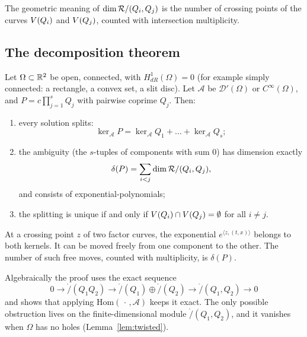 The geometric meaning of $\operatorname{dim}\mathcal{R}/(Q_i,Q_j)$ is the number of crossing points of the curves $V(Q_i)$ and $V(Q_j)$, counted with intersection multiplicity.

\subsection{The decomposition theorem}

\begin{theorem}\label{f:thm:factor}
Let $\Omega\subset\mathbb{R}^2$ be open, connected, with $H^1_{dR}(\Omega)=0$ (for example simply connected: a rectangle, a convex set, a slit disc). Let $\mathcal A$ be $\mathcal D'(\Omega)$ or $C^\infty(\Omega)$, and $P=c\prod_{j=1}^sQ_j$ with pairwise coprime $Q_j$. Then:
\begin{enumerate}[label=(\roman*)]
\item every solution splits:
\[
\ker_{\mathcal A}P=\ker_{\mathcal A}Q_1+\dots+\ker_{\mathcal A}Q_s ;
\]
\item the ambiguity (the $s$-tuples of components with sum $0$) has dimension exactly
\[
\delta(P)=\sum_{i<j}\operatorname{dim}\mathcal{R}/(Q_i,Q_j),
\]
and consists of exponential-polynomials;
\item the splitting is unique if and only if $V(Q_i)\cap V(Q_j)=\emptyset$ for all $i\ne j$.
\end{enumerate}
\end{theorem}

\begin{intuition}
At a crossing point $z$ of two factor curves, the exponential $e^{\langle z,(t,x)\rangle}$ belongs to both kernels. It can be moved freely from one component to the other. The number of such free moves, counted with multiplicity, is $\delta(P)$.

Algebraically the proof uses the exact sequence
\[
0\to\ring/(Q_1Q_2)\to\ring/(Q_1)\oplus\ring/(Q_2)\to\ring/(Q_1,Q_2)\to0
\]
and shows that applying $\mathrm{Hom}(\,\cdot\,,\mathcal A)$ keeps it exact. The only possible obstruction lives on the finite-dimensional module $\ring/(Q_1,Q_2)$, and it vanishes when $\Omega$ has no holes (Lemma~\ref{lem:twisted}).
\end{intuition}

